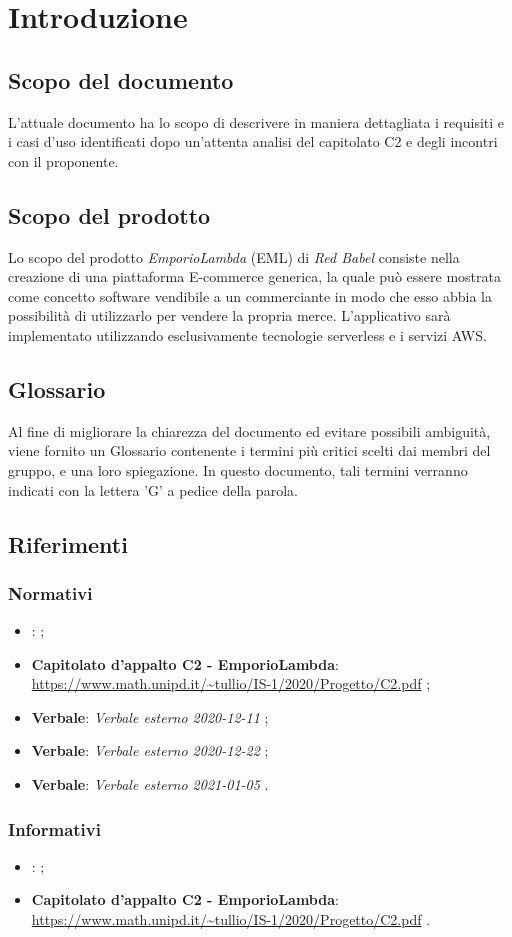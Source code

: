 \section{Introduzione}
\subsection{Scopo del documento}
L'attuale documento ha lo scopo di descrivere in maniera dettagliata i requisiti e i casi d'uso identificati dopo un'attenta analisi del capitolato C2 e degli incontri con il proponente.
\subsection{Scopo del prodotto}
Lo scopo del prodotto \textit{EmporioLambda} (EML) di \textit{Red Babel} consiste nella creazione di una piattaforma E-commerce generica, la quale può essere mostrata come concetto software vendibile a un commerciante in modo che esso abbia la possibilità di utilizzarlo per vendere la propria merce. L'applicativo sarà implementato utilizzando esclusivamente tecnologie serverless e i servizi AWS.
\subsection{Glossario}
Al fine di migliorare la chiarezza del documento ed evitare possibili ambiguità, viene fornito un Glossario contenente i termini più critici scelti dai membri del gruppo, e una loro spiegazione. In questo documento, tali termini verranno indicati con la lettera 'G' a pedice della parola.
\subsection{Riferimenti}
\subsubsection{Normativi}
\begin{itemize}
\item \textbf{\NdP}:  ;
\item \textbf{Capitolato d'appalto C2 - EmporioLambda}: \\ \url{https://www.math.unipd.it/~tullio/IS-1/2020/Progetto/C2.pdf} ;
\item \textbf{Verbale}: \textit{Verbale esterno 2020-12-11} ;
\item \textbf{Verbale}: \textit{Verbale esterno 2020-12-22} ;
\item \textbf{Verbale}: \textit{Verbale esterno 2021-01-05} .
\end{itemize}
\subsubsection{Informativi}
\begin{itemize}
\item \textbf{\SdF}:  ;
\item \textbf{Capitolato d'appalto C2 - EmporioLambda}: \\ \url{https://www.math.unipd.it/~tullio/IS-1/2020/Progetto/C2.pdf} .
\end{itemize}